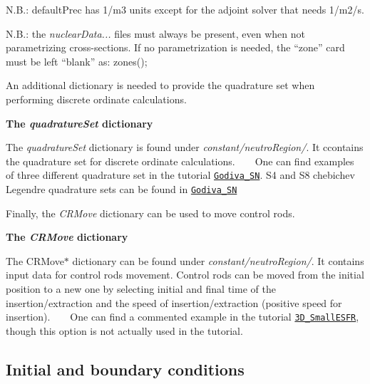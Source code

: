 N.\+B.\+: default\+Prec has 1/m3 units except for the adjoint solver that needs 1/m2/s.

N.\+B.\+: the {\itshape nuclear\+Data...} files must always be present, even when not parametrizing cross-\/sections. If no parametrization is needed, the “zone” card must be left “blank” as\+: {\ttfamily zones();} 

An additional dictionary is needed to provide the quadrature set when performing discrete ordinate calculations.

 {\bfseries The {\itshape quadrature\+Set} dictionary}

The {\itshape quadrature\+Set} dictionary is found under {\itshape constant/neutro\+Region/}. It ccontains the quadrature set for discrete ordinate calculations. ~\newline
~\newline
One can find examples of three different quadrature set in the tutorial \href{https://gitlab.com/foam-for-nuclear/GeN-Foam/-/tree/master/Tutorials/Godiva_SN/constant/neutroRegion/}{\tt Godiva\+\_\+\+SN}. S4 and S8 chebichev Legendre quadrature sets can be found in \href{https://gitlab.com/foam-for-nuclear/GeN-Foam/-/tree/develop/Tools/chebichevLegendreQuadratureSets/}{\tt Godiva\+\_\+\+SN} 

Finally, the {\itshape C\+R\+Move} dictionary can be used to move control rods.

 {\bfseries The {\itshape C\+R\+Move} dictionary}

The C\+R\+Move$\ast$ dictionary can be found under {\itshape constant/neutro\+Region/}. It contains input data for control rods movement. Control rods can be moved from the initial position to a new one by selecting initial and final time of the insertion/extraction and the speed of insertion/extraction (positive speed for insertion). ~\newline
~\newline
One can find a commented example in the tutorial \href{https://gitlab.com/foam-for-nuclear/GeN-Foam/-/tree/master/Tutorials/3D_SmallESFR/rootCase/constant/neutroRegion/CRmove}{\tt 3\+D\+\_\+\+Small\+E\+S\+FR}, though this option is not actually used in the tutorial. 

\subsection*{Initial and boundary conditions}

